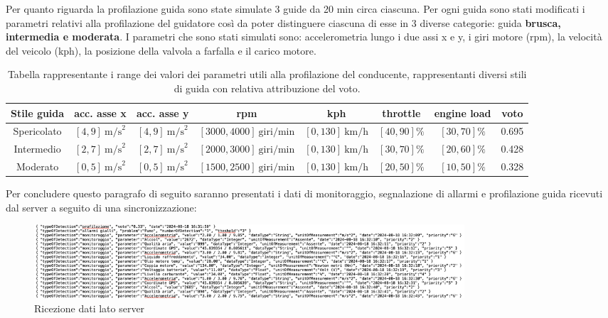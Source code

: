 \documentclass[12pt, a4paper, italian]{report}
\numberwithin{figure}{chapter}
\numberwithin{table}{chapter}
\begin{document}
Per quanto riguarda la profilazione guida sono state simulate 3 guide da 20 min circa ciascuna. Per ogni guida sono stati modificati i parametri relativi alla profilazione del guidatore così da poter distinguere ciascuna di esse in 3 diverse categorie: guida \textbf{brusca, intermedia e moderata}. I parametri che sono stati simulati sono: accelerometria lungo i due assi x e y, i giri motore (rpm), la velocità del veicolo (kph), la posizione della valvola a farfalla e il carico motore. 

\begin{table}[h!]
  \centering 
  \begin{adjustbox}{max width=\textwidth}
    \begin{tabular}{|c|c|c|c|c|c|c|c|}
      \hline
      \textbf{Stile guida} & \textbf{acc. asse x} & \textbf{acc. asse y} & \textbf{rpm} & \textbf{kph} & \textbf{throttle} & \textbf{engine load} & \textbf{voto} \\
      \hline
      Spericolato & $[4,9] \ \text{m/s}^2$ & $[4,9] \ \text{m/s}^2$ & $[3000,4000] \ \text{giri/min}$ & $[0,130] \ \text{km/h}$ & $[40,90] \%$ & $[30,70] \%$  & 0.695\\
      \hline
      Intermedio & $[2,7] \ \text{m/s}^2$ & $[2,7] \ \text{m/s}^2$ & $[2000,3000] \ \text{giri/min}$ & $[0,130] \ \text{km/h}$ & $[30,70] \%$ & $[20,60] \%$  & 0.428\\
      \hline
      Moderato & $[0,5] \ \text{m/s}^2$ & $[0,5] \ \text{m/s}^2$ & $[1500,2500] \ \text{giri/min}$ & $[0,130] \ \text{km/h}$ & $[20,50] \%$ & $[10,50] \%$  & 0.328\\
      \hline
    \end{tabular}
  \end{adjustbox}
  \caption{Tabella rappresentante i range dei valori dei parametri utili alla profilazione del conducente, rappresentanti diversi stili di guida con relativa attribuzione del voto.}
  \label{tab:stili_di_guida}
\end{table}

Per concludere questo paragrafo di seguito saranno presentati i dati di monitoraggio, segnalazione di allarmi e profilazione guida ricevuti dal server a seguito di una sincronizzazione:

\begin{figure}[h]
  \centering
  \includegraphics[width=16cm]{datiServer.png}
  \caption{Ricezione dati lato server}
  \label{fig:datiServer}
\end{figure}
\end{document}

